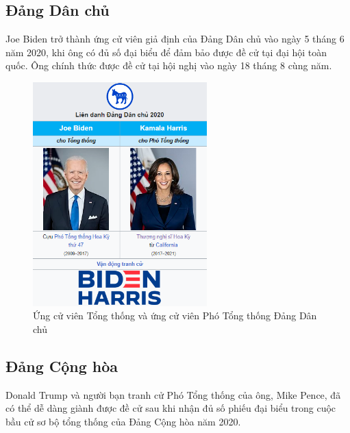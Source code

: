\documentclass[14pt, a4paper]{article}
\numberwithin{equation}{section}
\numberwithin{figure}{section}
\numberwithin{dl}{section}
\numberwithin{md}{section}
\numberwithin{bd}{section}
\numberwithin{dn}{section}
\numberwithin{hq}{section}
\begin{document}
    \subsection{Đảng Dân chủ}

    Joe Biden trở thành ứng cử viên giả định của Đảng Dân chủ vào ngày 5 tháng 6 năm 2020, khi ông có đủ số đại biểu để đảm bảo được đề cử tại đại hội toàn quốc. 
    Ông chính thức được đề cử tại hội nghị vào ngày 18 tháng 8 cùng năm.

    \begin{figure}[h!]
        \centering
        \includegraphics[width=0.6\textwidth]{Dem_Candidates.png}
        \caption{Ứng cử viên Tổng thống và ứng cử viên Phó Tổng thống Đảng Dân chủ}
    \end{figure}

    \subsection{Đảng Cộng hòa}

    Donald Trump và người bạn tranh cử Phó Tổng thống của ông, Mike Pence, đã có thể dễ dàng giành được đề cử sau khi nhận đủ số phiếu đại biểu trong cuộc bầu cử sơ bộ tổng thống của Đảng Cộng hòa năm 2020.
\end{document}
